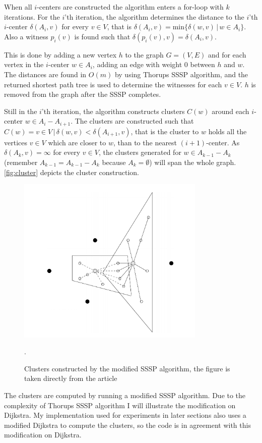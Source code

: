 When all $i$-centers are constructed the algorithm enters a for-loop
with $k$ iterations. For the $i$'th iteration, the algorithm determines the
distance to the $i$'th $i$-center $\delta(A_i , v)$ for every $v \in V$, that is
$\delta(A_i , v) = \textrm{min}\{\delta(w,v)\,|\,w \in A_i\}$. Also a witness 
$p_{i}(v)$ is found such that $\delta(p_{i}(v),v) = \delta(A_i , v)$.

This is done by adding a new vertex $h$ to the graph $G=(V,E)$ and for each
vertex in the $i$-center $w \in A_i$, adding an edge with weight $0$ between
$h$ and $w$. The distances are found in $O(m)$ by using Thorups SSSP algorithm,
and the returned shortest path tree is used to determine the witnesses for
each $v \in V$. $h$ is removed from the graph after the SSSP completes.

Still in the $i$'th iteration, the algorithm constructs clusters $C(w)$ around
each $i$-center $w \in A_i - A_{i+1}$. The clusters are constructed such that
$C(w) = {v \in V \,|\, \delta(w,v) < \delta(A_{i+1}, v)}$, that is the cluster
to $w$ holds all the vertices $v \in V$ which are closer to $w$, than to
the nearest $(i+1)$-center. As $\delta(A_k, v) = \infty$ for every $v \in
V$, the clusters generated for $w \in A_{k-1}-A_{k}$ (remember $A_{k-1}
= A_{k-1}-A_{k}$ because $A_{k}=\emptyset$) will span the whole graph.
\autoref{fig:cluster} depicts the cluster construction.
\begin{figure}[htbp]
    \centering
    \includegraphics[width=0.8\textwidth]{clusterconstruct.png}
    \caption{Clusters constructed by the modified SSSP algorithm, the figure
             is taken directly from the article\cite{tu}}.
    \label{fig:cluster}
\end{figure}
The clusters are computed by running a modified SSSP algorithm. Due to the
complexity of Thorups SSSP algorithm I will illustrate the modification
on Dijkstra. My implementation used for experiments in later sections also
uses a modified Dijkstra to compute the clusters, so the code is in
agreement with this modification on Dijkstra.

